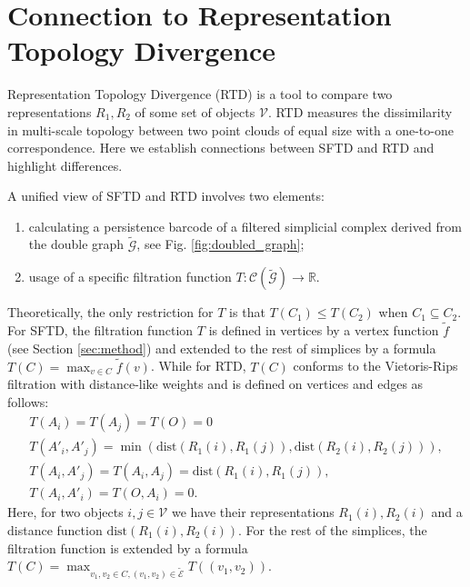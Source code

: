 \documentclass[runningheads]{llncs}
\begin{document}
\section{Connection to Representation Topology Divergence}

Representation Topology Divergence (RTD) \cite{barannikov2021representation} is a tool to compare two representations $R_1, R_2$ of some set of objects $\mathcal{V}$. RTD measures the dissimilarity in multi-scale topology
between two point clouds of equal size with a one-to-one correspondence.
Here we establish connections between SFTD and RTD and highlight differences.

A unified view of SFTD and RTD involves two elements:
\begin{enumerate}
    \item calculating a persistence barcode of a filtered simplicial complex derived from the double graph $\tilde{\mathcal{G}}$, see Fig. \ref{fig:doubled_graph};
    \item usage of a specific filtration function $T: \mathcal{C}(\tilde{\mathcal{G}}) \to \mathbb{R}$.
\end{enumerate}


Theoretically, the only restriction for $T$ is that $T(C_1) \le T(C_2)$ when $C_1 \subseteq C_2$.
For SFTD, the filtration function $T$ is defined in vertices by a vertex function $\tilde{f}$ (see Section \ref{sec:method}) and extended to the rest of simplices by a formula $T(C) = \max_{v \in C} \tilde{f}(v)$.
While for RTD, $T(C)$ conforms to the Vietoris-Rips filtration with distance-like weights and is defined on vertices and edges as follows:
\begin{gather*}
    T(A_i) = T(A_j) = T(O) = 0\nonumber \\
    T(A'_i, A'_j)=\min(\text{dist}(R_1(i), R_1(j)), \text{dist}(R_2(i), R_2(j))), \nonumber\\
    T(A_i,A'_j)=T(A_i,A_j)=\text{dist}(R_1(i), R_1(j)), \nonumber\\
    T(A_i,A'_i)=T(O,A_i)=0.\,\, \label{eq:matrO}
\end{gather*}
Here, for two objects $i, j \in \mathcal{V}$ we have their representations $R_1(i), R_2(i)$ and a distance function $\text{dist}(R_1(i), R_2(i))$. For the rest of the simplices, the filtration function is extended by a formula $T(C) = \max_{v_1, v_2 \in C, (v_1, v_2) \in \tilde{\mathcal{E}}} T((v_1, v_2))$.
\end{document}
